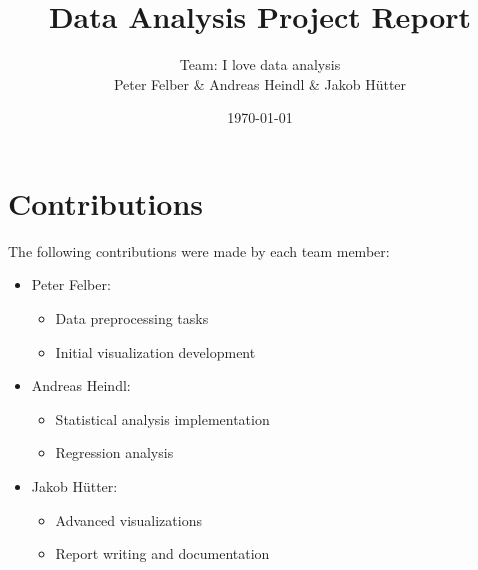 \documentclass[11pt]{article}
\title{Data Analysis Project Report}
\author{
  Team: I love data analysis\\ 
  Peter Felber \& Andreas Heindl \& Jakob Hütter
}
\date{\today}
\begin{document}
\maketitle

\begin{center}
\end{center}

\section{Contributions}
The following contributions were made by each team member:
\begin{itemize}
    \item Peter Felber:
    \begin{itemize}
        \item Data preprocessing tasks
        \item Initial visualization development
    \end{itemize}
    \item Andreas Heindl:
    \begin{itemize}
        \item Statistical analysis implementation
        \item Regression analysis
    \end{itemize}
    \item Jakob Hütter:
    \begin{itemize}
        \item Advanced visualizations
        \item Report writing and documentation
    \end{itemize}
\end{itemize}
\end{document}
